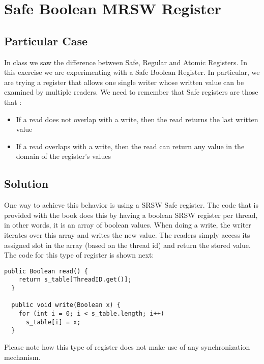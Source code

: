 \section{\textbf{Safe Boolean MRSW Register}}
\subsection{Particular Case}
\par
In class we saw the difference between Safe, Regular and Atomic Registers. In
this exercise we are experimenting with a Safe Boolean Register. In particular,
we are trying a register that allows one single writer whose written value can be
examined by multiple readers. We need to remember that Safe registers are those
that :
\begin{itemize}
\item If a read does not overlap with a write, then the read returns the last
written value
\item If a read overlaps with a write, then the read can return any value in the
domain of the register's values
\end{itemize}
\subsection{Solution}
\par
One way to achieve this behavior is using a SRSW Safe register. The code that is
provided with the book does this by having a boolean SRSW register per thread,
in other words, it is an array of boolean values. When doing a write, the writer
iterates over this array and writes the new value. The readers simply access its
assigned slot in the array (based on the thread id) and return the stored
value. The code for this type of register is shown next:
\par
\begin{lstlisting}[style=numbers]
  public Boolean read() {
    return s_table[ThreadID.get()];
  }

  public void write(Boolean x) {
    for (int i = 0; i < s_table.length; i++)
      s_table[i] = x;
  }
\end{lstlisting}
\hfill
\par
Please note how this type of register does not make use of any synchronization
mechanism.
